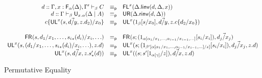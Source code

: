 \begin{figure}
\begin{small}
\[
\begin{array}{rcll}
d :: \Gamma,x:\mathsf{F}_{\alpha}(\Delta),\Gamma' \vdash_{\beta} C & \equiv_{\mathsf{p}} & \mathsf{FL}^{x}(\Delta.\mathsf{linv}(d,\Delta,x))\\
d :: \Gamma \vdash_{\beta} \mathsf{U}_{x.\alpha}(\Delta \mid A) & \equiv_{\mathsf{p}} & \mathsf{UR}(\Delta.\mathsf{rinv}(d,\Delta))\\
c\{\mathsf{UL}^{x}_{}(s,\vec{d/y},z.d_2)/x_0\} & \equiv_{\mathsf{p}} & \mathsf{UL}^{x}_{}(1_\beta[s/x_0],\vec{d/y},z.c\{d_2/x_0\})  \\
\\
\mathsf{FR}_{}(s,d_1/x_1,\ldots,{s_i}_*(d_i)/x_i,\ldots) & \equiv_{\mathsf{p}} & \mathsf{FR}_{}(s;(1_{\alpha[\alpha_1/x_1,\ldots,\alpha_{i-1}/x_{i-1},\ldots]}[s_i/x_i]),\vec{d_j/x_j})\\
\mathsf{UL}^{x}_{}(s,(d_1/x_1,\ldots,{s_i}_*(d_i)/x_i,\ldots),z.d) & \equiv_{\mathsf{p}} & \mathsf{UL}^{x}_{}(s;(1_{\beta'[\alpha[\alpha_1/x_1,\ldots,\alpha_{i-1}/x_{i-1},\ldots]/z]}[s_i/x_i]),\vec{d_j/x_j},z.d)\\
\mathsf{UL}^{x}_{}(s,\vec{d/x},z.s'_*(d)) & \equiv_{\mathsf{p}} & \mathsf{UL}^{x}_{}((s;s'[1_{\alpha[\gamma]}/z]),\vec{d/x},z.d) \\
\end{array}
\]
\end{small}
\caption{Permutative Equality}
\label{fig:permutative}
\end{figure}

